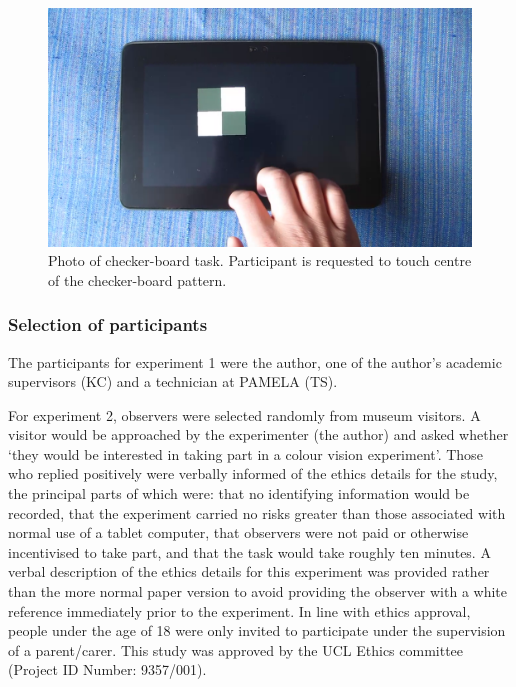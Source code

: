 \begin{figure}[hbp]
\includegraphics[max width=\textwidth]{figs/tablet/checker_board.png} %
\caption{Photo of checker-board task. Participant is requested to touch centre of the checker-board pattern.}
\label{fig:checker-board}
\end{figure}


\subsubsection{Selection of participants}

The participants for experiment 1 were the author, one of the author's academic supervisors (KC) and a technician at \acrshort{PAMELA} (TS).

For experiment 2, observers were selected randomly from museum visitors. A visitor would be approached by the experimenter (the author) and asked whether `they would be interested in taking part in a colour vision experiment'. Those who replied positively were verbally informed of the ethics details for the study, the principal parts of which were: that no identifying information would be recorded, that the experiment carried no risks greater than those associated with normal use of a tablet computer, that observers were not paid or otherwise incentivised to take part, and that the task would take roughly ten minutes. A verbal description of the ethics details for this experiment was provided rather than the more normal paper version to avoid providing the observer with a white reference immediately prior to the experiment. In line with ethics approval, people under the age of 18 were only invited to participate under the supervision of a parent/carer. This study was approved by the \gls{UCL} Ethics committee (Project ID Number: 9357/001). %


